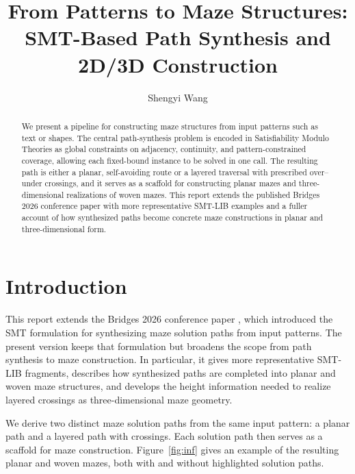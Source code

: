 \documentclass[acmsmall,screen,nonacm]{acmart}
\title{From Patterns to Maze Structures: SMT-Based Path Synthesis and 2D/3D Construction}
\author{Shengyi Wang}
\affiliation{%
  \institution{Shanghai Qi Zhi Institute}
  \city{Shanghai}
  \country{China}}
\date{}     %
\begin{document}
\begin{abstract}

  We present a pipeline for constructing maze structures from input
  patterns such as text or shapes. The central path-synthesis problem
  is encoded in Satisfiability Modulo Theories as global constraints
  on adjacency, continuity, and pattern-constrained coverage, allowing
  each fixed-bound instance to be solved in one call. The resulting
  path is either a planar, self-avoiding route or a layered traversal
  with prescribed over--under crossings, and it serves as a scaffold for
  constructing planar mazes and three-dimensional realizations of woven
  mazes. This report extends the published Bridges 2026 conference
  paper with more representative SMT-LIB examples and a fuller account
  of how synthesized paths become concrete maze constructions in
  planar and three-dimensional form.

\end{abstract}

\maketitle

\section{Introduction}

This report extends the Bridges 2026 conference paper
\cite{Wang2026PatternsMazeSolutions}, which introduced the SMT
formulation for synthesizing maze solution paths from input patterns.
The present version keeps that formulation but broadens the scope from
path synthesis to maze construction. In particular, it gives more
representative SMT-LIB fragments, describes how synthesized paths are
completed into planar and woven maze structures, and develops the
height information needed to realize layered crossings as
three-dimensional maze geometry.

We derive two distinct maze solution paths from the same input
pattern: a planar path and a layered path with crossings. Each
solution path then serves as a scaffold for maze construction.
Figure~\ref{fig:inf} gives an example of the resulting planar and
woven mazes, both with and without highlighted solution paths.
\end{document}
